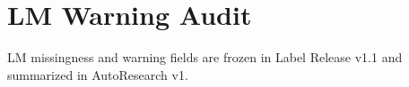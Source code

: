 \section{LM Warning Audit}
LM missingness and warning fields are frozen in Label Release v1.1 and summarized in AutoResearch v1.
